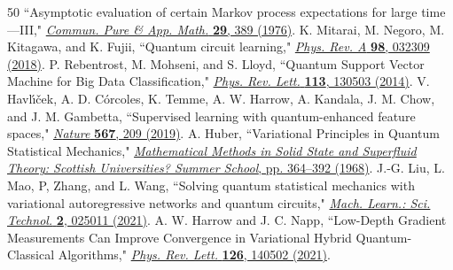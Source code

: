 \documentclass[aps,groupedaddress,superscriptaddress,amssymb,amsmath,amsbsy,amsfonts,twocolumn,pra]{revtex4}
\begin{document}
\begin{thebibliography}{50}
``Asymptotic evaluation of certain Markov process expectations for large time---III,"
\href{http://dx.doi.org/10.1002/cpa.3160290405}{
{\it Commun. Pure \& App. Math.} \textbf{29}, 389 (1976)}.
%
K. Mitarai, M. Negoro, M. Kitagawa, and K. Fujii,
``Quantum circuit learning,"
\href{http://dx.doi.org/10.1103/PhysRevA.98.032309}{
{\it Phys. Rev. A} \textbf{98}, 032309 (2018)}. 
%
P. Rebentrost, M. Mohseni, and S. Lloyd,
``Quantum Support Vector Machine for Big Data Classification,"
\href{http://dx.doi.org/10.1103/PhysRevLett.113.130503}{
{\it Phys. Rev. Lett.} \textbf{113}, 130503 (2014)}.
%
V. Havl{\'\i}{\v{c}}ek, A. D. C{\'o}rcoles, K. Temme, A. W. Harrow, A. Kandala, J. M. Chow, and J. M. Gambetta,
``Supervised learning with quantum-enhanced feature spaces," 
\href{http://dx.doi.org/10.1038/s41586-019-0980-2}{
{\it Nature} \textbf{567}, 209 (2019)}.
%
A. Huber,
``Variational Principles in Quantum Statistical Mechanics,"
\href{https://link.springer.com/chapter/10.1007/978-1-4899-6435-9_14}{
{\it Mathematical Methods in Solid State and Superfluid Theory: Scottish Universities? Summer School}, pp. 364--392 (1968)}.
%
J.-G. Liu, L. Mao, P, Zhang, and L. Wang,
``Solving quantum statistical mechanics with variational autoregressive networks and quantum circuits," 
\href{http://dx.doi.org/10.1088/2632-2153/aba19d}{
{\it Mach. Learn.: Sci. Technol.} \textbf{2}, 025011 (2021)}.
%
A. W. Harrow and J. C. Napp,
``Low-Depth Gradient Measurements Can Improve Convergence in Variational Hybrid Quantum-Classical Algorithms,"
\href{http://dx.doi.org/10.1103/PhysRevLett.126.140502}{
{\it Phys. Rev. Lett.} \textbf{126}, 140502 (2021)}.



\end{thebibliography}
\end{document}
